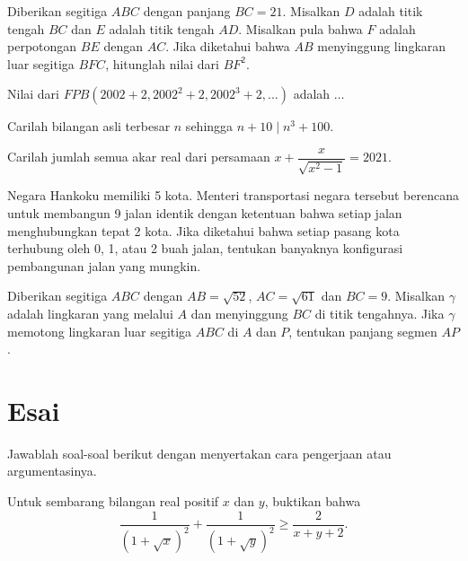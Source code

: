 \documentclass[11pt]{scrartcl}
\begin{document}
	
	
	\begin{soalbaru}
		Diberikan segitiga $ABC$ dengan panjang $BC = 21$. Misalkan $D $ adalah titik tengah
		$BC $ dan $E $ adalah titik tengah $AD$. Misalkan pula bahwa $F $ adalah perpotongan $BE$
		dengan $AC$. Jika diketahui bahwa $AB $ menyinggung lingkaran luar segitiga $BFC$,
		hitunglah nilai dari $BF^2$.
	\end{soalbaru}
	
	\begin{soalbaru}
		Nilai dari $FPB(2002+2,2002^2+2,2002^3+2,...)$ adalah $\dots$
	\end{soalbaru}
	
	\begin{soalbaru}
		Carilah bilangan asli terbesar $n$ sehingga $n+10 \mid n^3+100$.
	\end{soalbaru}
	
	\begin{soalbaru}
		Carilah jumlah semua akar real dari persamaan $x+\dfrac{x}{\sqrt{x^2-1}}=2021.$
	\end{soalbaru}
	
	\begin{soalbaru}
		Negara Hankoku memiliki 5 kota. Menteri transportasi negara tersebut berencana untuk
		membangun 9 jalan identik dengan ketentuan bahwa setiap jalan menghubungkan
		tepat 2 kota. Jika diketahui bahwa setiap pasang kota terhubung oleh 0, 1, atau 2
		buah jalan, tentukan banyaknya konfigurasi pembangunan jalan yang mungkin.
	\end{soalbaru}
	
	\begin{soalbaru}
		Diberikan segitiga $ABC $ dengan $AB = \sqrt{52}$, $AC=\sqrt{61}$ dan $BC = 9$. Misalkan $\gamma$
		adalah lingkaran yang melalui $A$ dan menyinggung $BC$ di titik tengahnya. Jika $\gamma$
		memotong lingkaran luar segitiga $ABC$ di $A$ dan $P$, tentukan panjang segmen $AP$.
	\end{soalbaru}
	
	\section{Esai}
	Jawablah soal-soal berikut dengan menyertakan cara pengerjaan atau argumentasinya.
	
	\begin{soalbaru}
	Untuk sembarang bilangan real positif $x$ dan $y$, buktikan bahwa $$\dfrac{1}{(1+\sqrt{x})^2}+\dfrac{1}{(1+\sqrt{y})^2} \ge \dfrac{2}{x+y+2}.$$
	\end{soalbaru}
	
\end{document}

